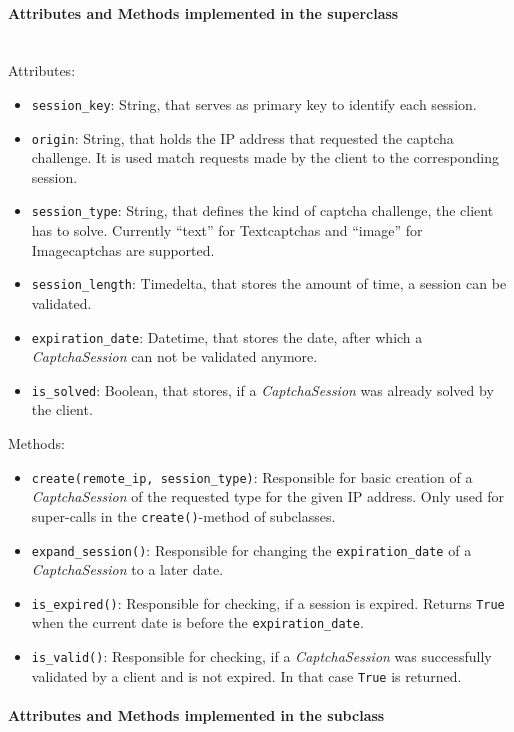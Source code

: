 \paragraph{Attributes and Methods implemented in the superclass} \mbox{} \\


Attributes:

\begin{itemize}
\item \verb|session_key|: String, that serves as primary key to identify each session. 
\item \verb|origin|: String, that holds the IP address that requested the captcha challenge. It is used match requests made by the client to the corresponding session.
\item \verb|session_type|: String, that defines the kind of captcha challenge, the client has to solve. Currently ``text'' for Textcaptchas and ``image'' for Imagecaptchas are supported.
\item \verb|session_length|: Timedelta, that stores the amount of time, a session can be validated.
\item \verb|expiration_date|: Datetime, that stores the date, after which a \emph{CaptchaSession} can not be validated anymore.
\item \verb|is_solved|: Boolean, that stores, if a \emph{CaptchaSession} was already solved by the client.
\end{itemize}


Methods:

\begin{itemize} 
\item \verb|create(remote_ip, session_type)|: Responsible for basic creation of a \emph{CaptchaSession} of the requested type for the given IP address. Only used for super-calls in the \verb|create()|-method of subclasses.
\item \verb|expand_session()|: Responsible for changing the \verb|expiration_date| of a \emph{CaptchaSession} to a later date.
\item \verb|is_expired()|: Responsible for checking, if a session is expired. Returns \verb|True| when the current date is before the \verb|expiration_date|.
\item \verb|is_valid()|: Responsible for checking, if a \emph{CaptchaSession} was successfully validated by a client and is not expired. In that case \verb|True| is returned.
\end{itemize}


\paragraph{Attributes and Methods implemented in the subclass} \mbox{} \\


